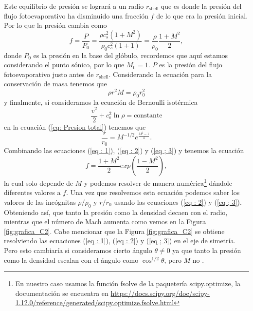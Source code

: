 \documentclass{book}
\begin{document}
Este equilibrio de presión se logrará a un radio $r_\mathrm{shell}$ que es donde la presión del flujo fotoevaporativo ha disminuido una fracción $f$ de lo que era la presión inicial. Por lo que la presión cambia como 
\begin{equation}\label{eq : 1}
f=\frac{P}{P_0}=\frac{\rho c_s^2(1+M^2)}{\rho_0 c_s^2(1+1)}=\frac{\rho}{\rho_0}\frac{1+M^2}{2},
\end{equation}
donde $P_0$ es la presión en la base del glóbulo, recordemos que aquí estamos considerando el punto sónico, por lo que  $M_0=1$. $P$ es la presión del flujo fotoevaporativo justo antes de $r_\mathrm{shell}$.
Considerando la ecuación para la conservación de masa tenemos que
\begin{equation}\label{eq : 2}
\rho r^2M	=\rho_0 r_0^2
\end{equation}
y finalmente, si consideramos la ecuación de Bernoulli isotérmica 
\begin{equation}
\frac{v^2}{2}+c_\mathrm{s}^2\ln\rho=\text{constante}
\end{equation}
en la ecuación (\ref{eq: Presion total}) tenemos que \citep{Dyson:1968}
\begin{equation}\label{eq ; 3} \frac{r}{r_0}=M^{-1/2}e^{\frac{M^2-1}{4}}.
\end{equation}
Combinando las ecuaciones (\ref{eq : 1}), (\ref{eq : 2}) y (\ref{eq ; 3})  y tenemos la ecuación
\begin{equation}
    f=\frac{1+M^2}{2}exp\left(\frac{1-M^2}{2}\right),
\end{equation}
la cual solo depende de $M$ y podemos resolver de manera numérica\footnote{En nuestro caso usamos la función fsolve de la paquetería scipy.optimize, la documentación se encuentra en \url{https://docs.scipy.org/doc/scipy-1.12.0/reference/generated/scipy.optimize.fsolve.html}} dándole diferentes valores a $f$. Una vez que resolvemos esta ecuación podemos saber los valores de las incógnitas  $\rho/\rho_0$ y $r/r_0$ usando las ecuaciones (\ref{eq : 2}) y (\ref{eq ; 3}). Obteniendo así, que tanto la presión como la densidad decaen con el radio, mientras que el número de Mach aumenta como vemos en la Figura \ref{fig:grafica_C2}. Cabe mencionar que la Figura \ref{fig:grafica_C2} se obtiene resolviendo las ecuaciones (\ref{eq : 1}), (\ref{eq : 2}) y (\ref{eq ; 3}) en el eje de simetría. Pero esto cambiaría si consideramos cierto ángulo $\theta\neq 0 $ ya que tanto la presión como la densidad escalan con el ángulo como $\cos^{1/2}\theta$, pero $M$ no \citep{Tarango:2018}.
\end{document}
